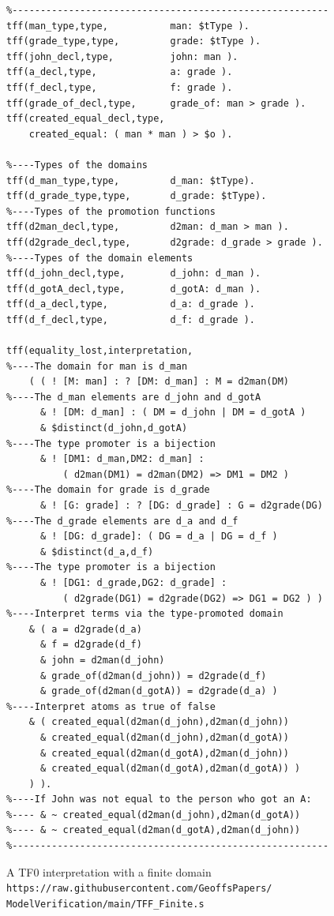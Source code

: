 \documentclass[letterpaper]{article}
\begin{document}
\begin{figure}[htbp]
\scriptsize
{}
\begin{verbatim}
%--------------------------------------------------------
tff(man_type,type,           man: $tType ).
tff(grade_type,type,         grade: $tType ).
tff(john_decl,type,          john: man ).
tff(a_decl,type,             a: grade ).
tff(f_decl,type,             f: grade ).
tff(grade_of_decl,type,      grade_of: man > grade ).
tff(created_equal_decl,type, 
    created_equal: ( man * man ) > $o ).

%----Types of the domains
tff(d_man_type,type,         d_man: $tType).
tff(d_grade_type,type,       d_grade: $tType).
%----Types of the promotion functions
tff(d2man_decl,type,         d2man: d_man > man ).
tff(d2grade_decl,type,       d2grade: d_grade > grade ).
%----Types of the domain elements
tff(d_john_decl,type,        d_john: d_man ).
tff(d_gotA_decl,type,        d_gotA: d_man ).
tff(d_a_decl,type,           d_a: d_grade ).
tff(d_f_decl,type,           d_f: d_grade ).

tff(equality_lost,interpretation,
%----The domain for man is d_man
    ( ( ! [M: man] : ? [DM: d_man] : M = d2man(DM)
%----The d_man elements are d_john and d_gotA
      & ! [DM: d_man] : ( DM = d_john | DM = d_gotA )
      & $distinct(d_john,d_gotA)
%----The type promoter is a bijection
      & ! [DM1: d_man,DM2: d_man] :
          ( d2man(DM1) = d2man(DM2) => DM1 = DM2 )
%----The domain for grade is d_grade
      & ! [G: grade] : ? [DG: d_grade] : G = d2grade(DG)
%----The d_grade elements are d_a and d_f
      & ! [DG: d_grade]: ( DG = d_a | DG = d_f )
      & $distinct(d_a,d_f)
%----The type promoter is a bijection
      & ! [DG1: d_grade,DG2: d_grade] :
          ( d2grade(DG1) = d2grade(DG2) => DG1 = DG2 ) )
%----Interpret terms via the type-promoted domain
    & ( a = d2grade(d_a)
      & f = d2grade(d_f)
      & john = d2man(d_john)
      & grade_of(d2man(d_john)) = d2grade(d_f)
      & grade_of(d2man(d_gotA)) = d2grade(d_a) )
%----Interpret atoms as true of false
    & ( created_equal(d2man(d_john),d2man(d_john))
      & created_equal(d2man(d_john),d2man(d_gotA))
      & created_equal(d2man(d_gotA),d2man(d_john))
      & created_equal(d2man(d_gotA),d2man(d_gotA)) ) 
    ) ).
%----If John was not equal to the person who got an A:
%---- & ~ created_equal(d2man(d_john),d2man(d_gotA))
%---- & ~ created_equal(d2man(d_gotA),d2man(d_john))
%--------------------------------------------------------
\end{verbatim}
\caption{A TF0 interpretation with a finite domain \\
{\scriptsize {\tt https://raw.githubusercontent.com/GeoffsPapers/\\
ModelVerification/main/TFF\_Finite.s}}}
\label{TF0FiniteInterpretation}
\end{figure}
\end{document}
